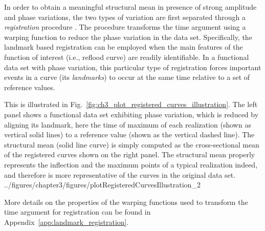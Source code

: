 In order to obtain a meaningful structural mean in presence of strong amplitude and phase variations,
the two types of variation are first separated through a \emph{registration} procedure \cite{Wang1997,Ramsay1998}.
The procedure transforms the time argument using a warping function to reduce the phase variation in the data set.
Specifically, the landmark based registration can be employed when the main features of the function of interest (i.e., reflood curve) are readily identifiable.
In a functional data set with phase variation, this particular type of registration forces important events in a curve (its \emph{landmarks}) to occur at the same time relative to a set of reference values.

This is illustrated in Fig.~\ref{fig:ch3_plot_registered_curves_illustration}.
The left panel shows a functional data set exhibiting phase variation, which is reduced by aligning its landmark, here the time of maximum of each realization (shown as vertical solid lines) to a reference value (shown as the vertical dashed line).
The structural mean (solid line curve) is simply computed as the cross-sectional mean of the registered curves shown on the right panel. 
The structural mean properly represents the inflection and the maximum points of a typical realization indeed, and therefore is more representative of the curves in the original data set.
{../figures/chapter3/figures/plotRegisteredCurvesIllustration_2}

More details on the properties of the warping functions used to transform the time argument for registration can be found in Appendix~\ref{app:landmark_registration}.

